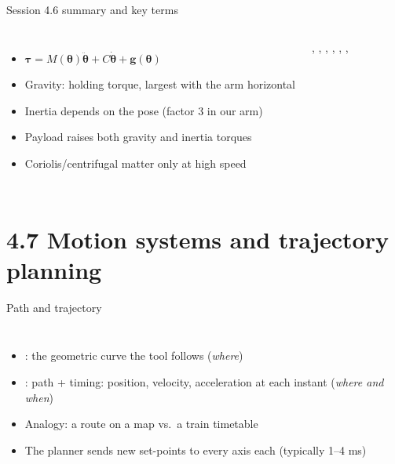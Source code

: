 \documentclass[aspectratio=169,10pt]{beamer}
\begin{document}
\begin{frame}[t]{Session 4.6 summary and key terms}
\begin{columns}[T,onlytextwidth]
\begin{itemize}\small
\item $\bm\tau=M(\bm\theta)\ddot{\bm\theta}+C\dot{\bm\theta}+\bm g(\bm\theta)$
\item Gravity: holding torque, largest with the arm horizontal
\item Inertia depends on the pose (factor 3 in our arm)
\item Payload raises both gravity and inertia torques
\item Coriolis/centrifugal matter only at high speed
\end{itemize}
\begin{defbox}
\small
{}, , , , , , 
\end{defbox}
\end{columns}
\end{frame}

\section{4.7 Motion systems and trajectory planning}

\begin{frame}[t]{Path and trajectory}
\begin{columns}[T,onlytextwidth]
\begin{itemize}\small
\item {}: the geometric curve the tool follows (\emph{where})
\item {}: path + timing: position, velocity, acceleration at each instant (\emph{where and when})
\item Analogy: a route on a map vs.\ a train timetable
\item The planner sends new set-points to every axis each  (typically 1--4 ms)
\end{itemize}
\centering
{}
\end{columns}
\end{frame}
\end{document}
